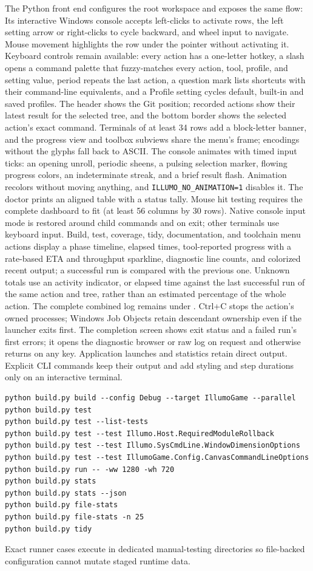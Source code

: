 The Python front end configures the root workspace and exposes the same flow:
Its interactive Windows console accepts left-clicks to activate rows, the left
setting arrow or right-clicks to cycle backward, and wheel input to navigate.
Mouse movement highlights the row under the pointer without activating it.
Keyboard controls remain available: every action has a one-letter hotkey, a
slash opens a command palette that fuzzy-matches every action, tool, profile,
and setting value, period repeats the last action, a question mark lists shortcuts with their
command-line equivalents, and a Profile setting cycles default, built-in and
saved profiles. The header shows the Git position; recorded actions show their
latest result for the selected tree, and the bottom border shows the selected
action's exact command. Terminals of at least 34 rows add a block-letter
banner, and the progress view and toolbox subviews share the menu's frame;
encodings without the glyphs fall back to ASCII. The console animates with
timed input ticks: an opening unroll, periodic sheens, a pulsing selection
marker, flowing progress colors, an indeterminate streak, and a brief result
flash. Animation recolors without moving anything, and
\texttt{ILLUMO\_NO\_ANIMATION=1} disables it. The doctor prints an aligned
table with a status tally. Mouse hit testing requires the complete
dashboard to fit (at least 56 columns by 30 rows). Native console input mode is
restored around child commands and on exit; other terminals use keyboard input.
Build, test, coverage, tidy, documentation, and toolchain menu actions display a
phase timeline, elapsed times, tool-reported progress with a rate-based ETA and
throughput sparkline, diagnostic line counts, and colorized recent output; a
successful run is compared with the previous one. Unknown totals use an
activity indicator, or elapsed time against the last successful run of the same
action and tree, rather than an estimated percentage of the whole action.
The complete combined log remains under .
Ctrl+C stops the action's owned processes; Windows Job Objects retain descendant
ownership even if the launcher exits first. The completion screen shows exit
status and a failed run's first errors; it opens the diagnostic browser or raw
log on request and otherwise returns on any key. Application launches and
statistics retain direct output. Explicit CLI commands keep their output and
add styling and step durations only on an interactive terminal.
\begin{lstlisting}[language={}]
python build.py build --config Debug --target IllumoGame --parallel
python build.py test
python build.py test --list-tests
python build.py test --test Illumo.Host.RequiredModuleRollback
python build.py test --test Illumo.SysCmdLine.WindowDimensionOptions
python build.py test --test IllumoGame.Config.CanvasCommandLineOptions
python build.py run -- -ww 1280 -wh 720
python build.py stats
python build.py stats --json
python build.py file-stats
python build.py file-stats -n 25
python build.py tidy
\end{lstlisting}
Exact runner cases execute in dedicated manual-testing directories so file-backed
configuration cannot mutate staged runtime data.

